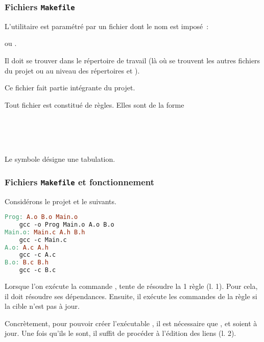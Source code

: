 \begin{frame}\frametitle{Fichiers {\tt Makefile}}
L'utilitaire  est paramétré par un fichier dont le nom est
imposé~:
\begin{center}
    \og {} \fg{} ou \og {} \fg.
\end{center}
Il doit se trouver dans le répertoire de travail (là où se trouvent les
autres fichiers du projet ou au niveau des répertoires 
et ).
\medskip

Ce fichier fait partie intégrante du projet.
\bigskip

Tout fichier  est constitué de \alert{règles}.
Elles sont de la forme
\smallskip

 \\
 \\
\Code{\vdots} \\
\bigskip

Le symbole \og\Code{$\rightarrow$}\fg{} désigne une tabulation.
\end{frame}

\begin{frame}[fragile]
\frametitle{Fichiers {\tt Makefile} et fonctionnement}
Considérons le projet et le  suivants.
\begin{multicols}{2}
\begin{center}
\end{center}
\bigskip
\bigskip
\begin{lstlisting}[language=make]
Prog: A.o B.o Main.o
    gcc -o Prog Main.o A.o B.o
Main.o: Main.c A.h B.h
    gcc -c Main.c
A.o: A.c A.h
    gcc -c A.c
B.o: B.c B.h
    gcc -c B.c
\end{lstlisting}
\end{multicols}
\bigskip

Lorsque l'on exécute la commande ,  tente de
résoudre la 1\iere{} règle (l. 1). Pour cela, il doit résoudre ses
dépendances. Ensuite, il exécute les commandes de la règle si la cible
n'est pas à jour.
\medskip

Concrètement, pour pouvoir créer l'exécutable , il est
nécessaire que ,  et  soient à jour.
Une fois qu'ils le sont, il suffit de procéder à l'édition des liens
(l. 2).
\end{frame}

